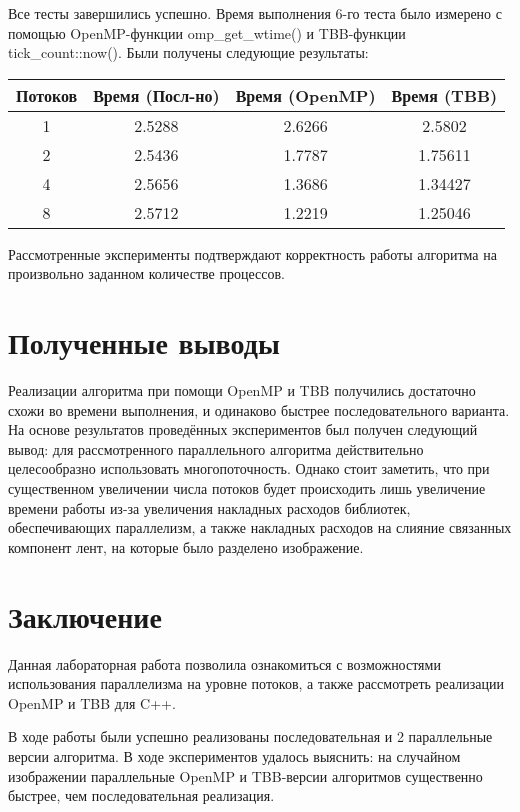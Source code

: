 \documentclass[14pt, russian]{extarticle}
\begin{document}
	\indent Все тесты завершились успешно. Время выполнения 6-го теста было измерено с помощью OpenMP-функции omp\_get\_wtime() и TBB-функции\\tick\_count::now(). Были получены следующие результаты:
	
	\begin{table}[ht]
		\centering
		\begin{tabular}{| c | c | c | c |}
			\hline
			Потоков & Время (Посл-но) & Время (OpenMP) & Время (TBB) \\ [0.5ex]
			\hline
			1 & 2.5288 & 2.6266 & 2.5802 \\
			\hline
			2 & 2.5436 & 1.7787 & 1.75611 \\
			\hline
			4 & 2.5656 & 1.3686 & 1.34427 \\
			\hline
			8 & 2.5712 & 1.2219 & 1.25046 \\
			\hline
		\end{tabular}
	\end{table}

	Рассмотренные эксперименты подтверждают корректность работы алгоритма на произвольно заданном количестве процессов.
	\newpage
	
	\section{Полученные выводы}
	Реализации алгоритма при помощи OpenMP и TBB получились достаточно схожи во времени выполнения, и одинаково быстрее последовательного варианта. На основе результатов проведённых экспериментов был получен следующий вывод: для рассмотренного параллельного алгоритма действительно целесообразно использовать многопоточность. Однако стоит заметить, что при существенном увеличении числа потоков будет происходить лишь увеличение времени работы из-за увеличения накладных расходов библиотек, обеспечивающих параллелизм, а также накладных расходов на слияние связанных компонент лент, на которые было разделено изображение.
	\newpage
	
	\section{Заключение}
	Данная лабораторная работа позволила ознакомиться с возможностями использования параллелизма на уровне потоков, а также рассмотреть реализации OpenMP и TBB для C++.
	
	В ходе работы были успешно реализованы последовательная и 2 параллельные версии алгоритма. В ходе экспериментов удалось выяснить: на случайном изображении параллельные OpenMP и TBB-версии алгоритмов существенно быстрее, чем последовательная реализация.
\end{document}

